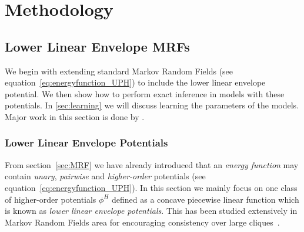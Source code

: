 
\chapter{Methodology}
\label{cha:methodology}

\section{Lower Linear Envelope MRFs}
\label{sec:inference}

We begin with extending standard Markov Random Fields (see
equation~\eqref{eq:energyfunction_UPH}) to include the lower
linear envelope potential. We then show how to perform exact
inference in models with these potentials. In \ref{sec:learning}
we will discuss learning the parameters of the models. Major
work in this section is done by .

\subsection{Lower Linear Envelope Potentials}
\label{sec:llep}
From section~\ref{sec:MRF} we have already introduced that an
\emph{energy function} may contain \emph{unary}, \emph{pairwise}
and \emph{higher-order} potentials (see
equation~\eqref{eq:energyfunction_UPH}). In this section we
mainly focus on one class of higher-order potentials $\phi^H$
defined as a concave piecewise linear function which is known as
\emph{lower linear envelope potentials}. This has been studied
extensively in Markov Random Fields area for encouraging
consistency over large
cliques~\cite{Kohli:CVPR07,Nowozin:2011,Gould:ICML2011}.

